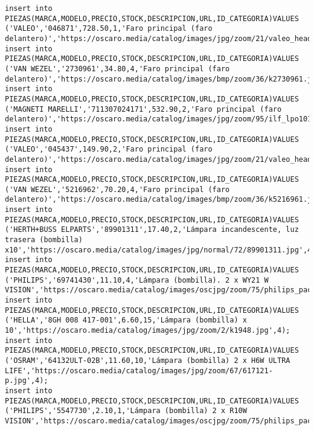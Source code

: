 \begin{lstlisting}[caption=Script .sql para crear la BD.]
insert into PIEZAS(MARCA,MODELO,PRECIO,STOCK,DESCRIPCION,URL,ID_CATEGORIA)VALUES ('VALEO','046871',728.50,1,'Faro principal (faro delantero)','https://oscaro.media/catalog/images/jpg/zoom/21/valeo_headlamp_046871_01.jpg',4);
insert into PIEZAS(MARCA,MODELO,PRECIO,STOCK,DESCRIPCION,URL,ID_CATEGORIA)VALUES ('VAN WEZEL','2730961',34.80,4,'Faro principal (faro delantero)','https://oscaro.media/catalog/images/bmp/zoom/36/k2730961.jpg',4);
insert into PIEZAS(MARCA,MODELO,PRECIO,STOCK,DESCRIPCION,URL,ID_CATEGORIA)VALUES ('MAGNETI MARELLI','711307024171',532.90,2,'Faro principal (faro delantero)','https://oscaro.media/catalog/images/jpg/zoom/95/ilf_lpo101_wr.jpg',4);
insert into PIEZAS(MARCA,MODELO,PRECIO,STOCK,DESCRIPCION,URL,ID_CATEGORIA)VALUES ('VALEO','045437',149.90,2,'Faro principal (faro delantero)','https://oscaro.media/catalog/images/jpg/zoom/21/valeo_headlamp_045437_01.jpg',4);
insert into PIEZAS(MARCA,MODELO,PRECIO,STOCK,DESCRIPCION,URL,ID_CATEGORIA)VALUES ('VAN WEZEL','5216962',70.20,4,'Faro principal (faro delantero)','https://oscaro.media/catalog/images/bmp/zoom/36/k5216961.jpg',4);
insert into PIEZAS(MARCA,MODELO,PRECIO,STOCK,DESCRIPCION,URL,ID_CATEGORIA)VALUES ('HERTH+BUSS ELPARTS','89901311',17.40,2,'Lámpara incandescente, luz trasera (bombilla) x10','https://oscaro.media/catalog/images/jpg/normal/72/89901311.jpg',4);
insert into PIEZAS(MARCA,MODELO,PRECIO,STOCK,DESCRIPCION,URL,ID_CATEGORIA)VALUES ('PHILIPS','69741430',11.10,4,'Lámpara (bombilla). 2 x WY21 W VISION','https://oscaro.media/catalog/images/oscjpg/zoom/75/philips_pack_pr_wy21w_69741430_12071b2_s_emea_16.jpg',4);
insert into PIEZAS(MARCA,MODELO,PRECIO,STOCK,DESCRIPCION,URL,ID_CATEGORIA)VALUES ('HELLA','8GH 008 417-001',6.60,15,'Lámpara (bombilla) x 10','https://oscaro.media/catalog/images/jpg/zoom/2/k1948.jpg',4);
insert into PIEZAS(MARCA,MODELO,PRECIO,STOCK,DESCRIPCION,URL,ID_CATEGORIA)VALUES ('OSRAM','64132ULT-02B',11.60,10,'Lámpara (bombilla) 2 x H6W ULTRA LIFE','https://oscaro.media/catalog/images/jpg/zoom/67/617121-p.jpg',4);
insert into PIEZAS(MARCA,MODELO,PRECIO,STOCK,DESCRIPCION,URL,ID_CATEGORIA)VALUES ('PHILIPS','5547730',2.10,1,'Lámpara (bombilla) 2 x R10W VISION','https://oscaro.media/catalog/images/oscjpg/zoom/75/philips_pack_pr_r10w_05547730_12814b2_s_emea_16.jpg',4);


\end{lstlisting}
